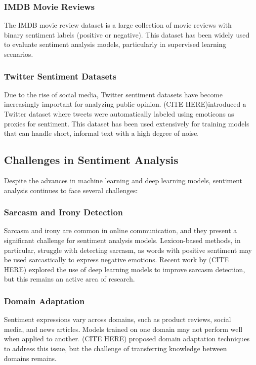 \subsubsection{IMDB Movie Reviews}

The IMDB movie review dataset is a large collection of movie reviews with binary sentiment labels (positive or negative). This dataset has been widely used to evaluate sentiment analysis models, particularly in supervised learning scenarios.

\subsubsection{Twitter Sentiment Datasets}

Due to the rise of social media, Twitter sentiment datasets have become increasingly important for analyzing public opinion. (CITE HERE)introduced a Twitter dataset where tweets were automatically labeled using emoticons as proxies for sentiment. This dataset has been used extensively for training models that can handle short, informal text with a high degree of noise.

\subsection{Challenges in Sentiment Analysis}

Despite the advances in machine learning and deep learning models, sentiment analysis continues to face several challenges:

\subsubsection{Sarcasm and Irony Detection}

Sarcasm and irony are common in online communication, and they present a significant challenge for sentiment analysis models. Lexicon-based methods, in particular, struggle with detecting sarcasm, as words with positive sentiment may be used sarcastically to express negative emotions. Recent work by (CITE HERE) explored the use of deep learning models to improve sarcasm detection, but this remains an active area of research.

\subsubsection{Domain Adaptation}

Sentiment expressions vary across domains, such as product reviews, social media, and news articles. Models trained on one domain may not perform well when applied to another. (CITE HERE) proposed domain adaptation techniques to address this issue, but the challenge of transferring knowledge between domains remains.

